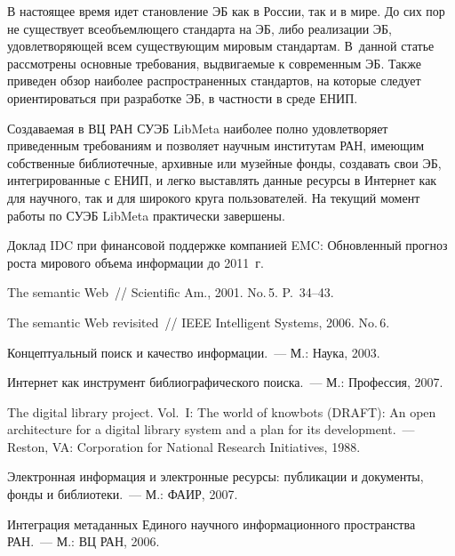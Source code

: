 \begin{multicols}{2}
  В настоящее время идет становление ЭБ как в России, так и в мире. До сих пор не 
существует всеобъемлющего стандарта на ЭБ, либо реализации ЭБ, удовлетворяющей всем 
существующим мировым стандартам. В~данной статье рассмотрены основные требования, 
выдвигаемые к современным ЭБ. Также приведен обзор наиболее распространенных 
стандартов, на которые следует ориентироваться при разработке ЭБ, в частности в среде 
ЕНИП.
  
  Создаваемая в ВЦ РАН СУЭБ LibMeta наиболее полно удовлетворяет приведенным 
требованиям и позволяет научным институтам РАН, имеющим собственные библиотечные, 
архивные или музейные фонды, создавать свои ЭБ, интегрированные с ЕНИП, и легко 
выставлять данные ресурсы в Интернет как для научного, так и для широкого круга 
пользователей. На текущий момент работы по СУЭБ LibMeta практически завершены.

\vspace*{-6pt}

{\small\frenchspacing
{%
\begin{thebibliography}{99}

Доклад IDC при финансовой поддержке компанией EMC: Обновленный прогноз роста 
мирового объема информации до 2011~г.

The semantic Web~// Scientific Am., 2001. No.\,5. P.~34--43.

The semantic Web revisited~// IEEE Intelligent Systems, 2006. No.\,6.

Концептуальный поиск и качество информации.~--- М.: Наука, 2003.

Интернет как инструмент библиографического поиска.~--- М.: Профессия, 2007.

The digital library project. Vol.~I: The world of knowbots (DRAFT): An open architecture for a 
digital library system and a plan for its development.~--- Reston, VA: Corporation for National 
Research Initiatives, 1988.

Электронная информация и электронные ресурсы: публикации и документы, фонды и 
библиотеки.~--- М.: ФАИР, 2007.

Интеграция метаданных Единого научного информационного пространства РАН.~--- М.: 
ВЦ РАН, 2006.


\end{thebibliography}}}
\end{multicols}
